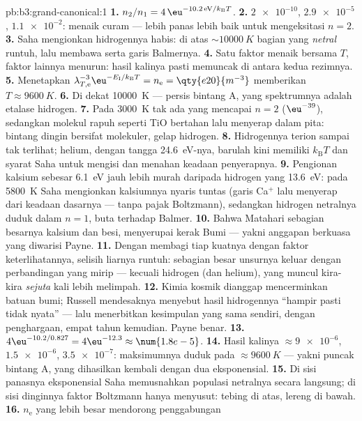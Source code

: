 \begin{solution}{pb:b3:grand-canonical:1}
\textbf{1.} $n_2/n_1 = 4\,\eu^{-10.2\,\text{eV}/k_{\text{B}}T}$.
\textbf{2.} $\num{2e-10}$, $\num{2.9e-5}$, $\num{1.1e-2}$: menaik
curam --- lebih panas lebih baik untuk mengeksitasi $n = 2$.
\textbf{3.} Saha mengionkan hidrogennya habis: di atas
$\sim\qty{10000}{K}$ bagian yang \emph{netral} runtuh, lalu membawa
serta garis Balmernya.
\textbf{4.} Satu faktor menaik bersama $T$, faktor lainnya menurun:
hasil kalinya pasti memuncak di antara kedua rezimnya.
\textbf{5.} Menetapkan $\lambda_{T,\text{e}}^{-3}\eu^{-E_{\text{I}}/
k_{\text{B}}T} = n_{\text{e}} = \qty{e20}{m^{-3}}$ memberikan $T
\approx \qty{9600}{K}$.
\textbf{6.} Di dekat \qty{10000}{K} --- persis bintang A, yang
spektrumnya adalah etalase hidrogen.
\textbf{7.} Pada \qty{3000}{K} tak ada yang mencapai $n = 2$
($\eu^{-39}$), sedangkan molekul rapuh seperti TiO bertahan lalu
menyerap dalam pita: bintang dingin bersifat molekuler, gelap hidrogen.
\textbf{8.} Hidrogennya terion sampai tak terlihat; helium, dengan
tangga \qty{24.6}{eV}-nya, barulah kini memiliki $k_{\text{B}}T$ dan
syarat Saha untuk mengisi dan menahan keadaan penyerapnya.
\textbf{9.} Pengionan kalsium sebesar \qty{6.1}{eV} jauh lebih murah
daripada hidrogen yang \qty{13.6}{eV}: pada \qty{5800}{K} Saha
mengionkan kalsiumnya nyaris tuntas (garis Ca$^+$ lalu menyerap dari
keadaan dasarnya --- tanpa pajak Boltzmann), sedangkan hidrogen netralnya
duduk dalam $n = 1$, buta terhadap Balmer.
\textbf{10.} Bahwa Matahari sebagian besarnya kalsium dan besi,
menyerupai kerak Bumi --- yakni anggapan berkuasa yang diwarisi Payne.
\textbf{11.} Dengan membagi tiap kuatnya dengan faktor keterlihatannya,
selisih liarnya runtuh: sebagian besar unsurnya keluar dengan
perbandingan yang mirip --- kecuali hidrogen (dan helium), yang muncul
kira-kira \emph{sejuta} kali lebih melimpah.
\textbf{12.} Kimia kosmik dianggap mencerminkan batuan bumi;
Russell mendesaknya menyebut hasil hidrogennya ``hampir
pasti tidak nyata'' --- lalu menerbitkan kesimpulan yang sama
sendiri, dengan penghargaan, empat tahun kemudian. Payne benar.
\textbf{13.} $4\eu^{-10.2/0.827} = 4\eu^{-12.3} \approx
\num{1.8e-5}$.
\textbf{14.} Hasil kalinya $\approx \num{9e-6}$, $\num{1.5e-6}$,
$\num{3.5e-7}$: maksimumnya duduk pada $\approx\qty{9600}{K}$ --- yakni
puncak bintang A, yang dihasilkan kembali dengan dua eksponensial.
\textbf{15.} Di sisi panasnya eksponensial Saha memusnahkan populasi
netralnya secara langsung; di sisi dinginnya faktor Boltzmann hanya
menyusut: tebing di atas, lereng di bawah.
\textbf{16.} $n_{\text{e}}$ yang lebih besar mendorong penggabungan

\end{solution}
